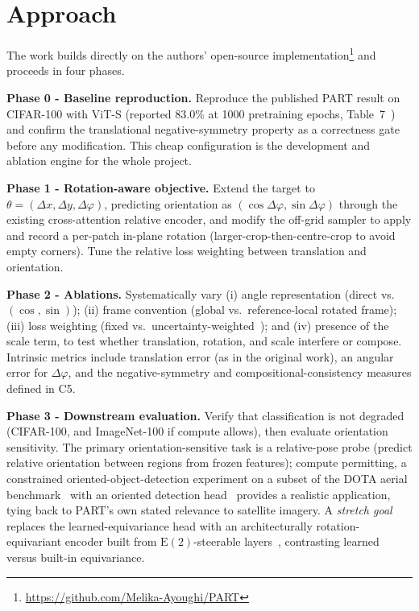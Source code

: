 \documentclass[11pt,a4paper]{article}
\begin{document}
\section{Approach}
The work builds directly on the authors' open-source implementation\footnote{\url{https://github.com/Melika-Ayoughi/PART}} and proceeds in four phases.

\textbf{Phase 0 - Baseline reproduction.} Reproduce the published PART result on CIFAR-100 with ViT-S (reported 83.0\% at 1000 pretraining epochs, Table~7~\cite{part}) and confirm the translational negative-symmetry property as a correctness gate before any modification. This cheap configuration is the development and ablation engine for the whole project.

\textbf{Phase 1 - Rotation-aware objective.} Extend the target to $\theta = (\Delta x, \Delta y, \Delta\varphi)$, predicting orientation as $(\cos\Delta\varphi, \sin\Delta\varphi)$ through the existing cross-attention relative encoder, and modify the off-grid sampler to apply and record a per-patch in-plane rotation (larger-crop-then-centre-crop to avoid empty corners). Tune the relative loss weighting between translation and orientation.

\textbf{Phase 2 - Ablations.} Systematically vary (i) angle representation (direct vs.\ $(\cos,\sin)$); (ii) frame convention (global vs.\ reference-local rotated frame); (iii) loss weighting (fixed vs.\ uncertainty-weighted~\cite{kendall}); and (iv) presence of the scale term, to test whether translation, rotation, and scale interfere or compose. Intrinsic metrics include translation error (as in the original work), an angular error for $\Delta\varphi$, and the negative-symmetry and compositional-consistency measures defined in C5.

\textbf{Phase 3 - Downstream evaluation.} Verify that classification is not degraded (CIFAR-100, and ImageNet-100 if compute allows), then evaluate orientation sensitivity. The primary orientation-sensitive task is a relative-pose probe (predict relative orientation between regions from frozen features); compute permitting, a constrained oriented-object-detection experiment on a subset of the DOTA aerial benchmark~\cite{dota} with an oriented detection head~\cite{orcnn} provides a realistic application, tying back to PART's own stated relevance to satellite imagery. A \emph{stretch goal} replaces the learned-equivariance head with an architecturally rotation-equivariant encoder built from $\mathrm{E}(2)$-steerable layers~\cite{e2cnn}, contrasting learned versus built-in equivariance.
\end{document}
